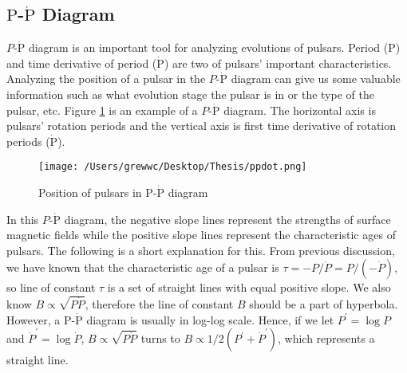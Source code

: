 \documentclass[12pt]{report}
\begin{document}
        \subsection{$\mbox{P}$-$\dot{\mbox{P}}$ Diagram} 
          $P$-$\dot{\mbox{P}}$ diagram is an important tool for analyzing evolutions of 
          pulsars. Period ($\mbox{P}$) and time derivative of period ($\dot{\mbox{P}}$) are 
          two of pulsars' important characteristics. Analyzing the position of a pulsar in 
          the $P$-$\dot{\mbox{P}}$ diagram can give us some valuable information such as 
          what evolution stage the pulsar is in or the type of the pulsar, etc. 
          Figure \ref{fig:p-pdot} is an example of a $P$-$\dot{\mbox{P}}$ diagram. 
          The horizontal axis is pulsars' rotation periods and the vertical axis is first time 
          derivative of rotation periods ($\dot{\mbox{P}}$).
          \begin{figure}[h]
              \centering
              \texttt{[image: /Users/grewwc/Desktop/Thesis/ppdot.png]}
              \caption{\protect Position of pulsars in $\mbox{P}$-$\dot{\mbox{P}}$ diagram}
              \label{fig:p-pdot}
          \end{figure}
          In this $P$-$\dot{\mbox{P}}$ diagram, the negative slope lines represent the strengths 
          of surface magnetic fields while the positive slope lines represent the characteristic 
          ages of pulsars. The following is a short explanation for this. 
          From previous discussion, we have known that the 
          characteristic age of a pulsar is $\tau=-P/\dot{P}=P/(-\dot{P})$, so line of constant 
          $\tau$ is a set of straight lines with equal positive slope. We also know 
          $B\propto\sqrt{P\dot{P}}$, therefore the line of constant $B$ should be a part 
          of hyperbola. However, a $\mbox{P}$-$\dot{\mbox{P}}$ diagram is usually in log-log 
          scale. Hence, if we let $P^{\prime}=\log{P}$ and $\dot{P}^{\prime}=\log{\dot{P}}$,
          $B\propto\sqrt{P\dot{P}}$ turns to 
          $B\propto 1/2 \left(P^{\prime} + \dot{P}^{\prime}\right)$, 
          which represents a straight line.
\end{document}
